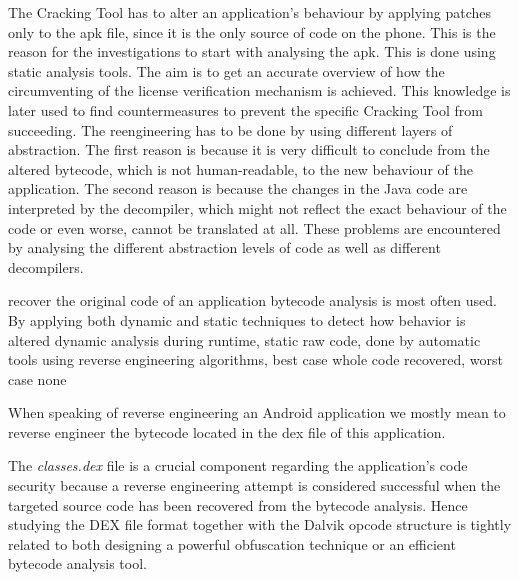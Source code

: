 The Cracking Tool has to alter an application's behaviour by applying patches only to the \gls{apk} file, since it is the only source of code on the phone. This is the reason for the investigations to start with analysing the \gls{apk}. This is done using static analysis tools. The aim is to get an accurate overview of how the circumventing of the license verification mechanism is achieved. This knowledge is later used to find countermeasures to prevent the specific Cracking Tool from succeeding.\newline
The reengineering has to be done by using different layers of abstraction. The first reason is because it is very difficult to conclude from the altered bytecode, which is not human-readable, to the new behaviour of the application. The second reason is because the changes in the Java code are interpreted by the decompiler, which might not reflect the exact behaviour of the code or even worse, cannot be translated at all.\newline
These problems are encountered by analysing the different abstraction levels of code as well as different decompilers.

%
recover the original code of an application bytecode analysis is most
often used. By applying both dynamic and static techniques to detect how behavior is altered\newline
dynamic analysis during runtime, static raw code, done by automatic tools using reverse engineering algorithms, best case whole code recovered, worst case none

When speaking of reverse engineering an Android application we mostly mean to reverse engineer the bytecode located in the dex file of this application.

The \textit{classes.dex} file is a crucial component regarding the application's code security because a reverse engineering attempt is considered successful when the targeted source code has been recovered from the bytecode analysis. Hence studying the DEX file format together with the Dalvik opcode structure is tightly related to both designing a powerful obfuscation technique or an efficient bytecode analysis tool.
\cite{kovachevaMaster}
%

